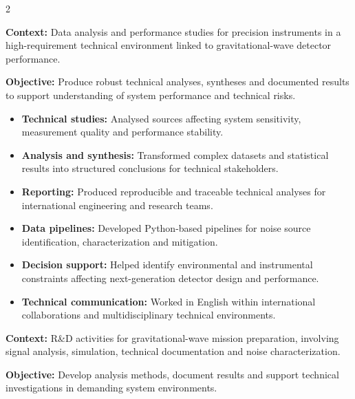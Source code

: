 \documentclass[8pt,a4paper,ragged2e,withhyper]{altacv}
\begin{document}
\begin{paracol}{2}
\divider


\textbf{Context:} Data analysis and performance studies for precision instruments in a high-requirement technical environment linked to gravitational-wave detector performance.

\textbf{Objective:} Produce robust technical analyses, syntheses and documented results to support understanding of system performance and technical risks.

\begin{itemize}
  \item \textbf{Technical studies:} Analysed sources affecting system sensitivity, measurement quality and performance stability.
  \item \textbf{Analysis and synthesis:} Transformed complex datasets and statistical results into structured conclusions for technical stakeholders.
  \item \textbf{Reporting:} Produced reproducible and traceable technical analyses for international engineering and research teams.
  \item \textbf{Data pipelines:} Developed Python-based pipelines for noise source identification, characterization and mitigation.
  \item \textbf{Decision support:} Helped identify environmental and instrumental constraints affecting next-generation detector design and performance.
  \item \textbf{Technical communication:} Worked in English within international collaborations and multidisciplinary technical environments.
\end{itemize}

\divider


\textbf{Context:} R\&D activities for gravitational-wave mission preparation, involving signal analysis, simulation, technical documentation and noise characterization.

\textbf{Objective:} Develop analysis methods, document results and support technical investigations in demanding system environments.


\end{paracol}
\end{document}
